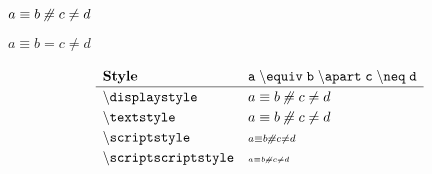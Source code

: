\documentclass[varwidth, border = 3pt]{standalone}
\newcommand{\test}%
           {a \equiv b \apart c \neq d}
\newcommand{\verbtest}%
           {a \mathmacro{equiv} b \mathmacro{apart} c \mathmacro{neq} d}
\newcommand{\testmathstyle}{
    \[
        \renewcommand{\arraystretch}{1.2}%
        \begin{array}{lll}
              \textbf{Style}
            & \mathtt{\verbtest}
            \\ \hline
              \mathtt{\backslash displaystyle}
            & \displaystyle \test
            \\
              \mathtt{\backslash textstyle}
            & \textstyle \test
            \\
              \mathtt{\backslash scriptstyle}
            & \scriptstyle \test
            \\
              \mathtt{\backslash scriptscriptstyle}
            & \scriptscriptstyle \test
        \end{array}
    \]
}
\begin{document}
$\test$

$a \equiv b = c \neq d$

\testmathstyle
\end{document}
